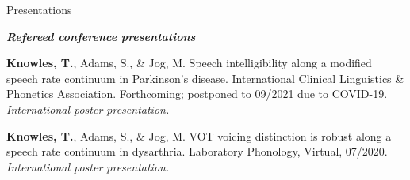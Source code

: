 \documentclass{resume} %
\begin{document}
\begin{rSection}{Presentations}
\begin{etaremune}
\end{etaremune}



\begin{center}
	{\bf \emph{Refereed conference presentations}}
\end{center}

\begin{etaremune}

\item {\bf Knowles, T.}, Adams, S., \& Jog, M. Speech intelligibility along a modified speech rate continuum in Parkinson's disease. International Clinical Linguistics \& Phonetics Association. Forthcoming; postponed to 09/2021 due to COVID-19.  \emph{International poster presentation.}

\item  {\bf Knowles, T.}, Adams, S., \& Jog, M. VOT voicing distinction is robust along a speech rate continuum in dysarthria. Laboratory Phonology, Virtual, 07/2020.  \emph{International poster presentation.}
   

\end{etaremune}
\end{rSection}
\end{document}
